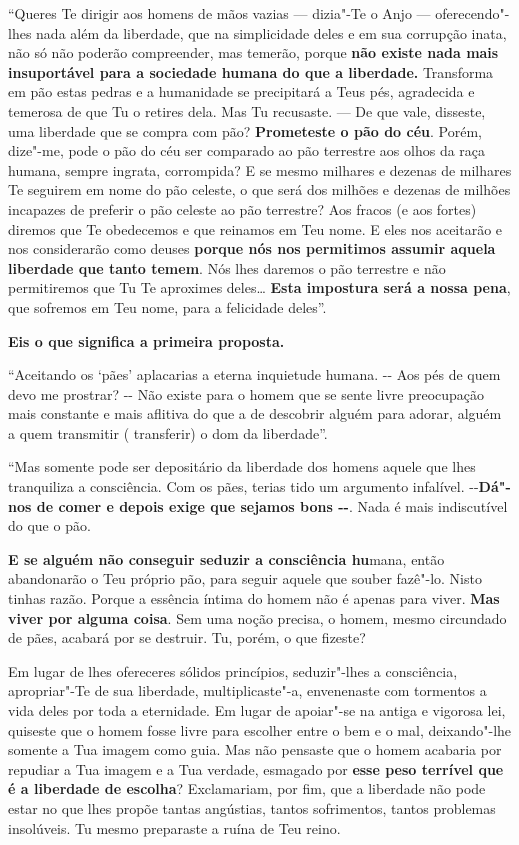 ``Queres Te dirigir aos homens de mãos vazias --- dizia"-Te o Anjo ---
oferecendo"-lhes nada além da liberdade, que na simplicidade deles e em
sua corrupção inata, não só não poderão compreender, mas temerão, porque
\textbf{não existe nada mais insuportável para a sociedade humana do que
a liberdade.} Transforma em pão estas pedras e a humanidade se
precipitará a Teus pés, agradecida e temerosa de que Tu o retires dela.
Mas Tu recusaste. --- De que vale, disseste, uma liberdade que se compra
com pão? \textbf{Prometeste o pão do céu}. Porém, dize"-me, pode o pão do
céu ser comparado ao pão terrestre aos olhos da raça humana, sempre
ingrata, corrompida? E se mesmo milhares e dezenas de milhares Te
seguirem em nome do pão celeste, o que será dos milhões e dezenas de
milhões incapazes de preferir o pão celeste ao pão terrestre? Aos fracos
(e aos fortes) diremos que Te obedecemos e que reinamos em Teu nome. E
eles nos aceitarão e nos considerarão como deuses \textbf{porque nós nos
permitimos assumir aquela liberdade que tanto temem}. Nós lhes daremos o
pão terrestre e não permitiremos que Tu Te aproximes deles\ldots{}
\textbf{Esta impostura será a nossa pena}, que sofremos em Teu nome,
para a felicidade deles''.

\textbf{Eis o que significa a primeira proposta.}

``Aceitando os `pães' aplacarias a eterna inquietude humana. -\/- Aos
pés de quem devo me prostrar? -\/- Não existe para o homem que se sente
livre preocupação mais constante e mais aflitiva do que a de descobrir
alguém para adorar, alguém a quem transmitir ( transferir) o dom da
liberdade''.

``Mas somente pode ser depositário da liberdade dos homens aquele que
lhes tranquiliza a consciência. Com os pães, terias tido um argumento
infalível. -\/-\textbf{Dá"-nos de comer e depois exige que sejamos bons
-\/-}. Nada é mais indiscutível do que o pão.

\textbf{E se alguém não conseguir seduzir a consciência hu}mana, então
abandonarão o Teu próprio pão, para seguir aquele que souber fazê"-lo.
Nisto tinhas razão. Porque a essência íntima do homem não é apenas para
viver. \textbf{Mas viver por alguma coisa}. Sem uma noção precisa, o
homem, mesmo circundado de pães, acabará por se destruir. Tu, porém, o
que fizeste?

Em lugar de lhes ofereceres sólidos princípios, seduzir"-lhes a
consciência, apropriar"-Te de sua liberdade, multiplicaste"-a, envenenaste
com tormentos a vida deles por toda a eternidade. Em lugar de apoiar"-se
na antiga e vigorosa lei, quiseste que o homem fosse livre para escolher
entre o bem e o mal, deixando"-lhe somente a Tua imagem como guia. Mas
não pensaste que o homem acabaria por repudiar a Tua imagem e a Tua
verdade, esmagado por \textbf{esse peso terrível que é a liberdade de
escolha}? Exclamariam, por fim, que a liberdade não pode estar no que
lhes propõe tantas angústias, tantos sofrimentos, tantos problemas
insolúveis. Tu mesmo preparaste a ruína de Teu reino.

